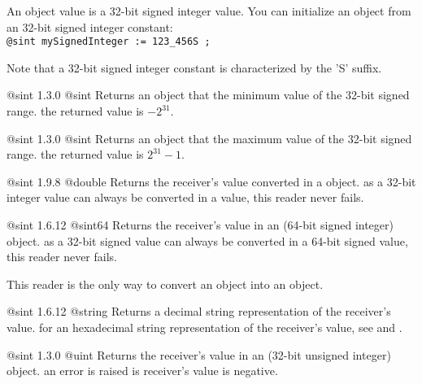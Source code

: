 

An  object value is a 32-bit signed integer value. You can initialize an  object from an 32-bit signed integer constant:\\

\texttt{@sint mySignedInteger := 123\_456S ;}

Note that a 32-bit signed integer constant is characterized by the 'S' suffix.




{@sint}
{1.3.0}
{@sint}
{Returns an  object that the minimum value of the 32-bit signed range.}
{the returned value is $-2^{31}$.}





{@sint}
{1.3.0}
{@sint}
{Returns an  object that the maximum value of the 32-bit signed range.}
{the returned value is $2^{31}-1$.}





{@sint}
{1.9.8}
{@double}
{Returns the receiver's value converted in a  object.}
{as a 32-bit integer value can always be converted in a  value, this reader never fails.}





{@sint}
{1.6.12}
{@sint64}
{Returns the receiver's value in an  (64-bit signed integer) object.}
{as a 32-bit signed value can always be converted in a 64-bit signed value, this reader never fails.}

This reader is the only way to convert an  object into an  object.





{@sint}
{1.6.12}
{@string}
{Returns a decimal string representation of the receiver's value.}
{for an hexadecimal string representation of the receiver's value, see  and .}







{@sint}
{1.3.0}
{@uint}
{Returns the receiver's value in an  (32-bit unsigned integer) object.}
{an error is raised is receiver's value is negative.}

